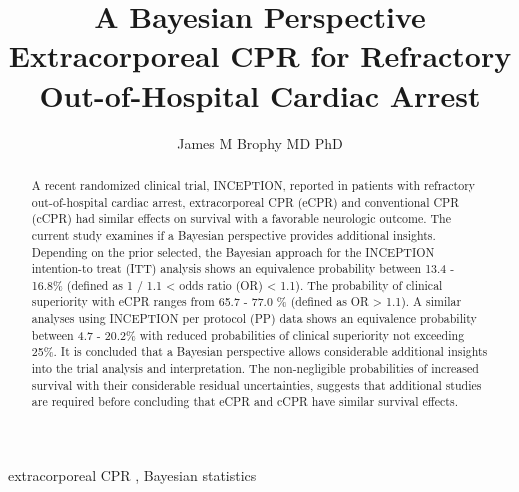 \documentclass[
  super,
  preprint,
  3p]{elsarticle}
\begin{document}
\begin{frontmatter}
\title{A Bayesian Perspective \\\large{Extracorporeal CPR for Refractory
Out-of-Hospital Cardiac Arrest} }
\author[1]{James M Brophy MD PhD%
%
}


        
\begin{abstract}
A recent randomized clinical trial, INCEPTION, reported in patients with
refractory out-of-hospital cardiac arrest, extracorporeal CPR (eCPR) and
conventional CPR (cCPR) had similar effects on survival with a favorable
neurologic outcome. The current study examines if a Bayesian perspective
provides additional insights. Depending on the prior selected, the
Bayesian approach for the INCEPTION intention-to treat (ITT) analysis
shows an equivalence probability between 13.4 - 16.8\% (defined as 1 /
1.1 \textless{} odds ratio (OR) \textless{} 1.1). The probability of
clinical superiority with eCPR ranges from 65.7 - 77.0 \% (defined as OR
\textgreater{} 1.1). A similar analyses using INCEPTION per protocol
(PP) data shows an equivalence probability between 4.7 - 20.2\% with
reduced probabilities of clinical superiority not exceeding 25\%. It is
concluded that a Bayesian perspective allows considerable additional
insights into the trial analysis and interpretation. The non-negligible
probabilities of increased survival with their considerable residual
uncertainties, suggests that additional studies are required before
concluding that eCPR and cCPR have similar survival effects.
\end{abstract}





\begin{keyword}
    extracorporeal CPR \sep 
    Bayesian statistics
\end{keyword}
\end{frontmatter}
    \ifdefined\Shaded\renewenvironment{Shaded}{\begin{tcolorbox}[frame hidden, sharp corners, breakable, interior hidden, borderline west={3pt}{0pt}{shadecolor}, enhanced, boxrule=0pt]}{\end{tcolorbox}}\fi
\end{document}

